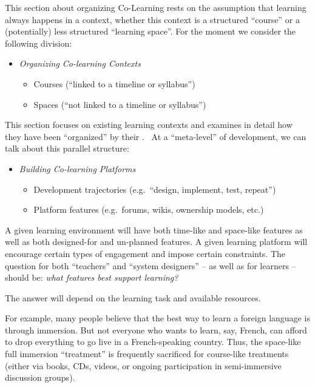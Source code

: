 This section about organizing Co-Learning rests on the assumption that
learning always happens in a context, whether this context is a
structured ``course'' or a (potentially) less structured ``learning
space''. For the moment we consider the following division:

\begin{itemize}
\itemsep1pt\parskip0pt
\item
  \emph{Organizing Co-learning Contexts}

  \begin{itemize}
  \itemsep1pt\parskip0pt
  \item
    Courses (``linked to a timeline or syllabus'')
  \item
    Spaces (``not linked to a timeline or syllabus'')
  \end{itemize}
\end{itemize}

This section focuses on existing learning contexts and examines in
detail how they have been ``organized'' by their .~ At a ``meta-level''
of development, we can talk about this parallel structure:

\begin{itemize}
\itemsep1pt\parskip0pt
\item
  \emph{Building Co-learning Platforms}

  \begin{itemize}
  \itemsep1pt\parskip0pt
  \item
    Development trajectories (e.g.~``design, implement, test, repeat'')
  \item
    Platform features (e.g.~forums, wikis, ownership models, etc.)
  \end{itemize}
\end{itemize}

A given learning environment will have both time-like and space-like
features as well as both designed-for and un-planned features. A given
learning platform will encourage certain types of engagement and impose
certain constraints. The question for both ``teachers'' and ``system
designers'' -- as well as for learners -- should be: \emph{what features
best support learning?}

The answer will depend on the learning task and available resources.

For example, many people believe that the best way to learn a foreign
language is through immersion. But not everyone who wants to learn, say,
French, can afford to drop everything to go live in a French-speaking
country. Thus, the space-like full immersion ``treatment'' is frequently
sacrificed for course-like treatments (either via books, CDs, videos, or
ongoing participation in semi-immersive discussion groups).

